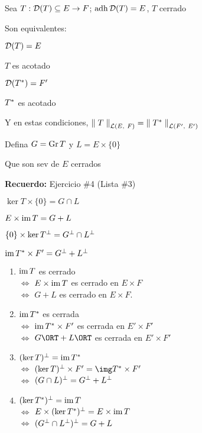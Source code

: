 
\renewcommand{\catnum}{\theNPclase \ No Presencial}%
\renewcommand{\fecha}{21 de abril de 2020}


\begin{thm}\label{thm:caract-op-acot}
Sea $T: \mathcal{D}(T) \subseteq E \to F$; $\operatorname{\mathop{\text{\upshape{adh}}}} \mathcal{D}(T) = E$, $T$ cerrado

Son equivalentes:
\begin{ienumerate}
    \item $\mathcal{D}(T) = E$
    \item $T$ es acotado
    \item $\mathcal{D}(T^{*}) = F'$
    \item $T^{*}$ es acotado
\end{ienumerate}
Y en estas condiciones, $\norm[\cl(E,\ F)]{T} = \norm[\cl(F',\ E')]{T\adj}$ %
\end{thm}

Defina $G = \operatorname{\mathop{\text{\upshape{Gr}}}} T$ y $L = E \times \{ 0\}$

Que son sev de $E$ cerrados

\textbf{Recuerdo:} Ejercicio \#4 (Lista \#3)

\begin{ienumerate}
    \item $\ker T \times \{ 0\} = G \cap L$
    \item $E \times \operatorname{\mathop{\text{\upshape{im}}}} T = G + L$
    \item $\{ 0 \} \times \ker T^{\perp} = G^{\perp} \cap L^{\perp}$
    \item $\operatorname{\mathop{\text{\upshape{im}}}} T^{*} \times F' = G^{\perp} + L^{\perp}$
\end{ienumerate}

\begin{enumerate}
    \item $\operatorname{\mathop{\text{\upshape{im}}}} T $ es cerrado  \\ 
    $\iff $ $E\times \operatorname{\mathop{\text{\upshape{im}}}} T$ es cerrado en $E \times F$ \\
    $\iff$ $G + L$ es cerrado en $E \times F$.
    \item $\operatorname{\mathop{\text{\upshape{im}}}} T^{*}$ es cerrada \\
    $\iff$ $\operatorname{\mathop{\text{\upshape{im}}}} T^{*} \times F'$ es cerrada en $E' \times F'$ \\
    $\iff$ $G\ORT + L\ORT$ es cerrada en $E' \times F'$ 
    \item $(\ker T )^{\perp} = \operatorname{\mathop{\text{\upshape{im}}}} T^{*}$ \\
    $\iff$ $(\ker T)\ort \times F' = \img T\adj \times F'$ \\ 
    $\iff$ $(G \cap L)^{\perp} = G^{\perp} + L^{\perp}$
    \item $(\ker T^{*})^{\perp} = \operatorname{\mathop{\text{\upshape{im}}}} T$ \\
    $\iff$ $E \times (\ker T ^{*}) ^{\perp} = E \times \operatorname{\mathop{\text{\upshape{im}}}} T$ \\
    $\iff$ $(G^{\perp} \cap L^{\perp}) ^{\perp} = G + L$
\end{enumerate}

